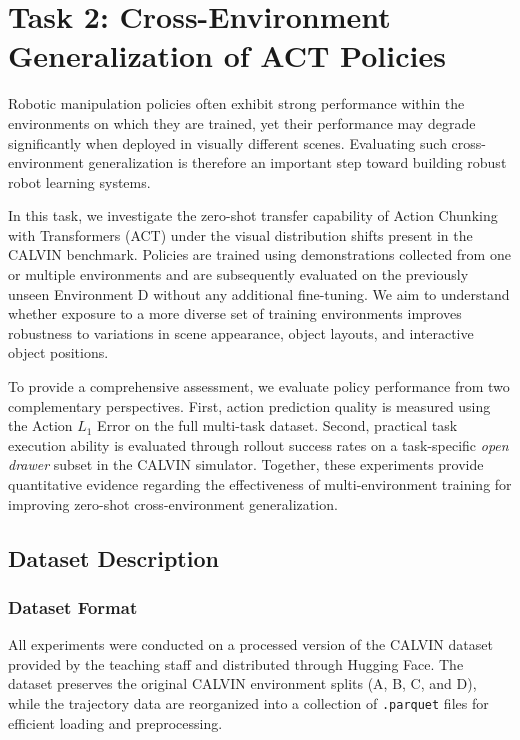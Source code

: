 \section{Task 2: Cross-Environment Generalization of ACT Policies}

Robotic manipulation policies often exhibit strong performance within the environments on which they are trained, yet their performance may degrade significantly when deployed in visually different scenes. Evaluating such cross-environment generalization is therefore an important step toward building robust robot learning systems.

In this task, we investigate the zero-shot transfer capability of Action Chunking with Transformers (ACT) under the visual distribution shifts present in the CALVIN benchmark. Policies are trained using demonstrations collected from one or multiple environments and are subsequently evaluated on the previously unseen Environment D without any additional fine-tuning. We aim to understand whether exposure to a more diverse set of training environments improves robustness to variations in scene appearance, object layouts, and interactive object positions.

To provide a comprehensive assessment, we evaluate policy performance from two complementary perspectives. First, action prediction quality is measured using the Action $L_1$ Error on the full multi-task dataset. Second, practical task execution ability is evaluated through rollout success rates on a task-specific \textit{open drawer} subset in the CALVIN simulator. Together, these experiments provide quantitative evidence regarding the effectiveness of multi-environment training for improving zero-shot cross-environment generalization.

\subsection{Dataset Description}

\subsubsection{Dataset Format}

All experiments were conducted on a processed version of the CALVIN dataset provided by the teaching staff and distributed through Hugging Face. The dataset preserves the original CALVIN environment splits (A, B, C, and D), while the trajectory data are reorganized into a collection of \texttt{.parquet} files for efficient loading and preprocessing.

